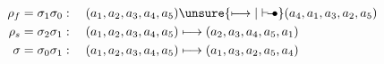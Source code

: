 \[
\begin{aligned}
\rho_f=\sigma_1\sigma_0&:\quad(a_1,a_2,a_3,a_4,a_5)\unsure{\longmapsto|\mathrel{\vdash\!\!\!-\!\!\bullet}}(a_4,a_1,a_3,a_2,a_5)\\
\rho_s=\sigma_2\sigma_1&:\quad(a_1,a_2,a_3,a_4,a_5)\longmapsto(a_2,a_3,a_4,a_5,a_1)\\
\sigma=\sigma_0\sigma_1&:\quad(a_1,a_2,a_3,a_4,a_5)\longmapsto(a_1,a_3,a_2,a_5,a_4)
\end{aligned}
\]
